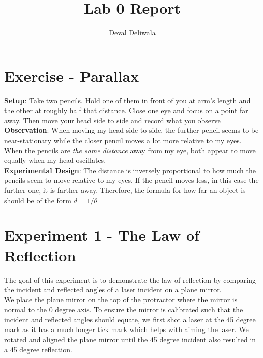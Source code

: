 \documentclass[svgnames]{article}     %
\title{Lab 0 Report}
\author{Deval Deliwala}
\begin{document}
\maketitle
\tableofcontents %

\section{Exercise - Parallax}

\textbf{Setup}: Take two pencils.  Hold one of them in front of you at arm’s
length and the other at roughly half that distance.  Close one eye and focus on
a point far away. Then move your head side to side and record what you observe \\

\textbf{Observation}: When moving my head side-to-side, the further pencil
seems to be near-stationary while the closer pencil moves a lot more relative
to my eyes. When the pencils are \textit{the same distance} away from my eye,
both appear to move equally when my head oscillates. \\ 

\textbf{Experimental Design}: The distance is inversely proportional to how
much the pencils seem to move relative to my eyes. If the pencil moves less, in
this case the further one, it is farther away. Therefore, the formula for how
far an object is should be of the form $d = 1 / \theta$ \\

\section{Experiment 1 - The Law of Reflection}

The goal of this experiment is to demonstrate the law of reflection by
comparing the incident and reflected angles of a laser incident on a plane
mirror. \\

We place the plane mirror on the top of the protractor where the mirror is
normal to the 0 degree axis. To ensure the mirror is calibrated such that the
incident and reflected angles should equate, we first shot a laser at the 45
degree mark as it has a much longer tick mark which helps with aiming the
laser. We rotated and aligned the plane mirror until the 45 degree incident
also resulted in a 45 degree reflection. \\
\end{document}
